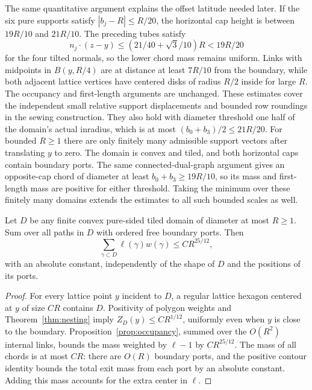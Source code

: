 The same quantitative argument explains the offset latitude needed later. If the six pure supports satisfy $|b_j-R|\le R/20$, the horizontal cap height is between $19R/10$ and $21R/10$. The preceding tubes satisfy
\[
 n_j\cdot(z-y)\le(21/40+\sqrt3/10)R<19R/20
\]
for the four tilted normals, so the lower chord mass remains uniform. Links with midpoints in $B(y,R/4)$ are at distance at least $7R/10$ from the boundary, while both adjacent lattice vertices have centered disks of radius $R/2$ inside for large $R$. The occupancy and first-length arguments are unchanged. These estimates cover the independent small relative support displacements and bounded row roundings in the sewing construction. They also hold with diameter threshold one half of the domain's actual inradius, which is at most $(b_0+b_3)/2\le21R/20$. For bounded $R\ge1$ there are only finitely many admissible support vectors after translating $y$ to zero. The domain is convex and tiled, and both horizontal caps contain boundary ports. The same connected-dual-graph argument gives an opposite-cap chord of diameter at least $b_0+b_3\ge19R/10$, so its mass and first-length mass are positive for either threshold. Taking the minimum over these finitely many domains extends the estimates to all such bounded scales as well.


\begin{corollary}\label{cor:convex-first-length}
Let $D$ be any finite convex pure-sided tiled domain of diameter at most $R\ge1$. Sum over all paths in $D$ with ordered free boundary ports. Then
\[
 \sum_{\gamma\subset D}\ell(\gamma)w(\gamma)\le CR^{25/12},
\]
with an absolute constant, independently of the shape of $D$ and the positions of its ports.
\end{corollary}
\begin{proof}
For every lattice point $y$ incident to $D$, a regular lattice hexagon centered at $y$ of size $CR$ contains $D$. Positivity of polygon weights and Theorem~\ref{thm:nesting} imply $Z_D(y)\le CR^{1/12}$, uniformly even when $y$ is close to the boundary. Proposition~\ref{prop:occupancy}, summed over the $O(R^2)$ internal links, bounds the mass weighted by $\ell-1$ by $CR^{25/12}$. The mass of all chords is at most $CR$: there are $O(R)$ boundary ports, and the positive contour identity bounds the total exit mass from each port by an absolute constant. Adding this mass accounts for the extra center in $\ell$.
\end{proof}
